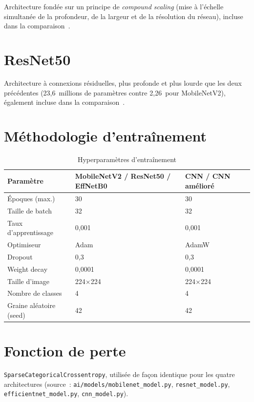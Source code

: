 Architecture fond\'ee sur un principe de \emph{compound scaling} (mise \`a l'\'echelle simultan\'ee de la profondeur, de la largeur et de la r\'esolution du r\'eseau), incluse dans la comparaison~\cite{efficientnet}.

\section{ResNet50}

Architecture \`a connexions r\'esiduelles, plus profonde et plus lourde que les deux pr\'ec\'edentes (23,6~millions de param\`etres contre 2,26~pour MobileNetV2), \'egalement incluse dans la comparaison~\cite{resnet}.

\section{M\'ethodologie d'entra\^inement}

\begin{table}[H]
\centering
\caption{Hyperparam\`etres d'entra\^inement}
\label{tab:hyperparams}
\begin{tabular}{lll}
\toprule
Param\`etre & MobileNetV2 / ResNet50 / EffNetB0 & CNN / CNN am\'elior\'e \\
\midrule
\'Epoques (max.) & 30 & 30 \\
Taille de batch & 32 & 32 \\
Taux d'apprentissage & 0,001 & 0,001 \\
Optimiseur & Adam & AdamW \\
Dropout & 0,3 & 0,3 \\
Weight decay & 0,0001 & 0,0001 \\
Taille d'image & 224$\times$224 & 224$\times$224 \\
Nombre de classes & 4 & 4 \\
Graine al\'eatoire (seed) & 42 & 42 \\
\bottomrule
\end{tabular}
\end{table}

\section{Fonction de perte}

\texttt{SparseCategoricalCrossentropy}, utilis\'ee de fa\c{c}on identique pour les quatre architectures (source~: \texttt{ai/models/mobilenet\_model.py}, \texttt{resnet\_model.py}, \texttt{efficientnet\_model.py}, \texttt{cnn\_model.py}).

